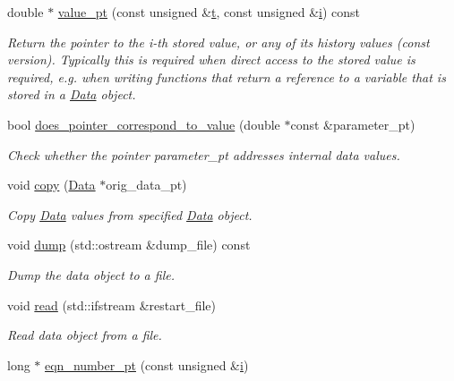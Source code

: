\begin{DoxyCompactItemize}
double $\ast$ \hyperlink{classoomph_1_1Data_ae96cadc48ab7d39aa6ed7bd91abe2e47}{value\+\_\+pt} (const unsigned \&\hyperlink{cfortran_8h_af6f0bd3dc13317f895c91323c25c2b8f}{t}, const unsigned \&\hyperlink{cfortran_8h_adb50e893b86b3e55e751a42eab3cba82}{i}) const
\begin{DoxyCompactList}\small\item\em Return the pointer to the i-\/th stored value, or any of its history values (const version). Typically this is required when direct access to the stored value is required, e.\+g. when writing functions that return a reference to a variable that is stored in a \hyperlink{classoomph_1_1Data}{Data} object. \end{DoxyCompactList}\item 
bool \hyperlink{classoomph_1_1Data_a1f001b88764d62579e0ed8d53f9d359f}{does\+\_\+pointer\+\_\+correspond\+\_\+to\+\_\+value} (double $\ast$const \&parameter\+\_\+pt)
\begin{DoxyCompactList}\small\item\em Check whether the pointer parameter\+\_\+pt addresses internal data values. \end{DoxyCompactList}\item 
void \hyperlink{classoomph_1_1Data_a57889a9db7ca009434f0268173fcf3f8}{copy} (\hyperlink{classoomph_1_1Data}{Data} $\ast$orig\+\_\+data\+\_\+pt)
\begin{DoxyCompactList}\small\item\em Copy \hyperlink{classoomph_1_1Data}{Data} values from specified \hyperlink{classoomph_1_1Data}{Data} object. \end{DoxyCompactList}\item 
void \hyperlink{classoomph_1_1Data_a87fa5ba80f2e6f0d0fb9658b9b358c05}{dump} (std\+::ostream \&dump\+\_\+file) const
\begin{DoxyCompactList}\small\item\em Dump the data object to a file. \end{DoxyCompactList}\item 
void \hyperlink{classoomph_1_1Data_ad520cff679734b7654b1638ada2c728a}{read} (std\+::ifstream \&restart\+\_\+file)
\begin{DoxyCompactList}\small\item\em Read data object from a file. \end{DoxyCompactList}\item 
long $\ast$ \hyperlink{classoomph_1_1Data_a35cc8d05b72d9101e54ddf5808da4a54}{eqn\+\_\+number\+\_\+pt} (const unsigned \&\hyperlink{cfortran_8h_adb50e893b86b3e55e751a42eab3cba82}{i})

\end{DoxyCompactItemize}
